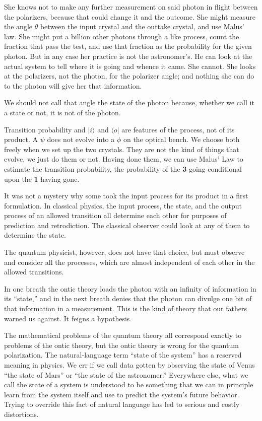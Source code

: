\documentclass[a4paper,11pt]{article}
\begin{document}
She knows not to make any further  
 measurement
on said photon
in flight  between the polarizers,
because that could change it and the outcome.
She might measure the angle $\theta$ between the input crystal
and the outtake crystal, and use Malus' law.
She might put a billion other
photons through a like process,
count the fraction that pass the test,
and use that fraction as the probability for the given photon.
But in any case her practice is not the astronomer's.
He can  look at the actual system to tell where it is going and whence it came.
She cannot.
She looks at the polarizers,
not the photon, for the polarizer angle;
and nothing she can do to the photon
will give her that information.

We should not call that angle the state of the photon
because, 
whether we call it a state or not,
it is not of the photon.

Transition probability and $|i\rangle$ and $\langle o|$
are features of the process, 
not of its product.
A $\psi$ does not evolve into a $\phi$
on the optical bench.
We choose  both freely 
when we set up the two crystals.
They are not the kind of things that evolve,
we just do them or not.
Having done them,
we can use Malus' Law to estimate the transition probability,
the probability of the {\bf 3} going conditional upon the {\bf 1} having gone.


It was not a mystery
why some took the input process  for its product
in a first formulation.
In classical physics,
the input process, the state, and the output process
of an allowed transition
all determine each other
for purposes of  prediction and retrodiction.
The classical observer could look at any of them
to determine the state.

The quantum physicist, however,
 does not have that choice,
but must observe and consider
all the processes,
which are almost independent of each other
in the allowed transitions.

In one breath the ontic theory loads 
the photon 
with an infinity of information
in its ``state,''
and in the next breath
denies that the photon can divulge one bit of that information in 
a measurement.
This is the kind of theory that our fathers warned us against.
It feigns a hypothesis.

The  mathematical problems of the quantum theory
all correspond exactly to problems of the ontic theory,
but the ontic theory is wrong for the quantum polarization.
The natural-language term  ``state of the system'' 
has a reserved meaning in physics.
We err if we call  data 
gotten by observing the state of Venus
``the state of Mars''  or ``the state of the astronomer.''
Everywhere else,
what  we call the state of a system 
is understood to be something that we can 
in principle learn  from the system itself
and use to predict
the system's future behavior.
Trying to override  this fact of natural language has
led to serious and costly distortions.
\end{document}
